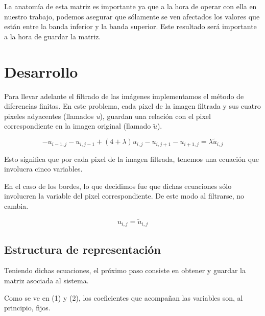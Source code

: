 \documentclass[a4paper]{article}
\begin{document}
La anatomía de esta matriz es importante ya que a la hora de operar con ella en nuestro trabajo, podemos asegurar que sólamente se ven afectados los valores que están entre la banda inferior y la banda superior. Este resultado será importante a la hora de guardar la matriz.


\section{Desarrollo}

Para llevar adelante el filtrado de las imágenes implementamos el método de diferencias finitas.
En este problema, cada pixel de la imagen filtrada y sus cuatro pixeles adyacentes (llamados \textit{u}), guardan una relación con el pixel correspondiente en la imagen original (llamado $\tilde{u}$).

\begin{equation}
 -u_{i - 1, j} - u_{i, j - 1} + (4 + \lambda ) u_{i,j} - u_{i, j + 1} - u_{i + 1, j} = \lambda \tilde{u}_{i,j}
 \label{eqs}
\end{equation}

Esto significa que por cada pixel de la imagen filtrada, tenemos una ecuación que involucra cinco variables.

En el caso de los bordes, lo que decidimos fue que dichas ecuaciones sólo involucren la variable del pixel correspondiente. De este modo al filtrarse, no cambia.

\begin{equation}
u_{i,j} = \tilde{u}_{i,j}
\end{equation}

\subsection{Estructura de representación}

Teniendo dichas ecuaciones, el próximo paso consiste en obtener y guardar la matriz asociada al sistema.

Como se ve en (1) y (2), los coeficientes que acompañan las variables son, al principio, fijos.
\end{document}
